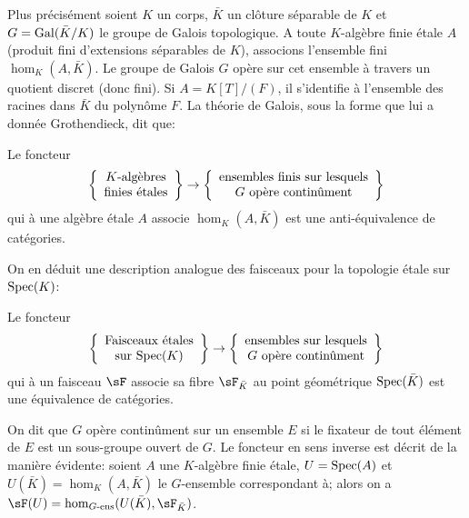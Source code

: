 Plus précisément soient $K$ un corps, $\bar K$ un clôture séparable de $K$ et 
$G = \operatorname{Gal}(\bar K/K)$ le groupe de Galois topologique. A toute $K$-algèbre finie 
étale $A$ (produit fini d'extensions séparables de $K$), associons l'ensemble 
fini $\hom_K(A,\bar K)$. Le groupe de Galois $G$ opère sur cet ensemble à 
travers un quotient discret (donc fini). Si $A=K[T]/(F)$, il s'identifie à 
l'ensemble des racines dans $\bar K$ du polynôme $F$. La théorie de Galois, 
sous la forme que lui a donnée Grothendieck, dit que:





\begin{proposition}\label{I:2-4-3}
Le foncteur 
\[
  \left\{\begin{array}{c}
          \textnormal{$K$-algèbres} \\ 
          \textnormal{finies étales}
        \end{array}\right\}
  \to  
  \left\{\begin{array}{c}
          \textnormal{ensembles finis sur lesquels} \\
          \textnormal{$G$ opère continûment}
        \end{array}\right\}
\]
qui à une algèbre étale $A$ associe $\hom_K(A,\bar K)$ est une 
anti-équivalence de catégories.
\end{proposition}

On en déduit une description analogue des faisceaux pour la topologie étale sur 
$\operatorname{Spec}(K)$:





\begin{proposition}\label{I:2-4-4}
Le foncteur 
\[
  \left\{\begin{array}{c}
          \textnormal{Faisceaux étales} \\ 
          \textnormal{sur $\operatorname{Spec}(K)$}
        \end{array}\right\}
  \to 
  \left\{\begin{array}{c}
          \textnormal{ensembles sur lesquels} \\
          \textnormal{$G$ opère continûment}
        \end{array}\right\}
\]
qui à un 
faisceau $\sF$ associe sa fibre $\sF_{\bar K}$ au point géométrique 
$\operatorname{Spec}(\bar K)$ est une équivalence de catégories.
\end{proposition}

On dit que $G$ opère continûment sur un ensemble $E$ si le fixateur de tout 
élément de $E$ est un sous-groupe ouvert de $G$. Le foncteur en sens 
inverse est décrit de la manière évidente: soient $A$ une 
$K$-algèbre finie étale, $U=\operatorname{Spec}(A)$ et $U(\bar K)=\hom_K(A,\bar K)$ le 
$G$-ensemble correspondant à; alors on a 
$\sF(U)= \hom_{G\text{-ens}}(U(\bar K),\sF_{\bar K})$. 

